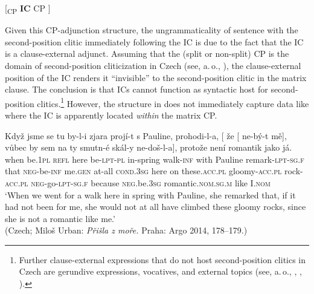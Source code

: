\documentclass[output=paper,colorlinks,citecolor=brown,
modfonts,newtxmath
]{langscibook}
\begin{document}
\ea\label{tree:CPadjunction}
{[\textsubscript{CP} \textbf{IC} CP ]}
\z

\noindent Given this CP-adjunction structure, the ungrammaticality of sentence  with the second-position clitic immediately following the IC is due to the fact that the IC is a clause-external adjunct. Assuming that the (split or non-split) CP is the domain of second-position cliticization in Czech (see, a.\,o., \citealt{Junghanns2002,Lenertova2004}), the clause-external position of the IC renders it ``invisible'' to the second-position clitic in the matrix clause. The conclusion is that ICs cannot function as syntactic host for second-position clitics.\footnote{Further clause-external expressions that do not host second-position clitics in Czech are gerundive expressions, vocatives, and external topics (see, a.\,o., \citealt{Dokulil1956}, \citealt{Travnicek1959}, \citealt[130--131]{Junghanns2002}).}
However, the structure in  does not immediately capture data like  where the IC is apparently located \textit{within} the matrix CP.

\ea\label{ex:Pauline}
\gll Když jsme se tu by-l-i zjara projí-t s Pauline, prohodi-l-a, [\hspace{-2pt} že [\hspace{-2pt} ne-bý-t mě], vůbec by sem na ty smutn-é skál-y ne-doš-l-a], protože není romantik jako já.\\
	when be.\textsc{1pl} \textsc{refl} here be-\textsc{lpt-pl} {in-spring} walk-\textsc{inf} with Pauline remark-\textsc{lpt-sg.f} {} that {} \textsc{neg}-be-\textsc{inf} me.\textsc{gen} {at-all} \textsc{cond.3sg} here on these.\textsc{acc.pl} gloomy-\textsc{acc.pl} rock-\textsc{acc.pl} \textsc{neg}-go-\textsc{lpt-sg.f} because \textsc{neg}.be.\textsc{3sg} romantic.\textsc{nom.sg.m} like I.\textsc{nom}\\ 
\glt `When we went for a walk here in spring with Pauline, she remarked that, if it had not been for me, she would not at all have climbed these gloomy rocks, since she is not a romantic like me.' \\ \hfill (Czech; Miloš Urban: \textit{Přišla z moře.} Praha: Argo 2014, 178--179.)
\z
\end{document}
